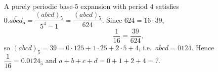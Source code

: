 A purely periodic base-$5$ expansion with period $4$ satisfies $0.\overline{abcd}_5=\dfrac{(abcd)_5}{5^4-1}=\dfrac{(abcd)_5}{624}$. Since $624=16\cdot39$,
\[
\dfrac{1}{16}=\dfrac{39}{624},
\]
so $(abcd)_5=39=0\cdot125+1\cdot25+2\cdot5+4$, i.e.\ $abcd=0124$. Hence $\dfrac{1}{16}=0.\overline{0124}_5$ and $a+b+c+d=0+1+2+4=\boxed{7}$.
